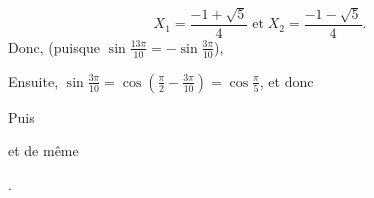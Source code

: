 {\begin{enumerate}
{$$X_1=\frac{-1+\sqrt{5}}{4}\;\mbox{et}\;X_2=\frac{-1-\sqrt{5}}{4}.$$
Donc, (puisque $\sin\frac{13\pi}{10}=-\sin\frac{3\pi}{10}$),

\begin{center}
\end{center}
Ensuite, $\sin\frac{3\pi}{10}=\cos\left(\frac{\pi}{2}-\frac{3\pi}{10}\right)=\cos\frac{\pi}{5}$, et donc

\begin{center}
\end{center}
Puis

\begin{center}
\end{center}
et de même 

\begin{center}
.
\end{center}}
\end{enumerate}
}
